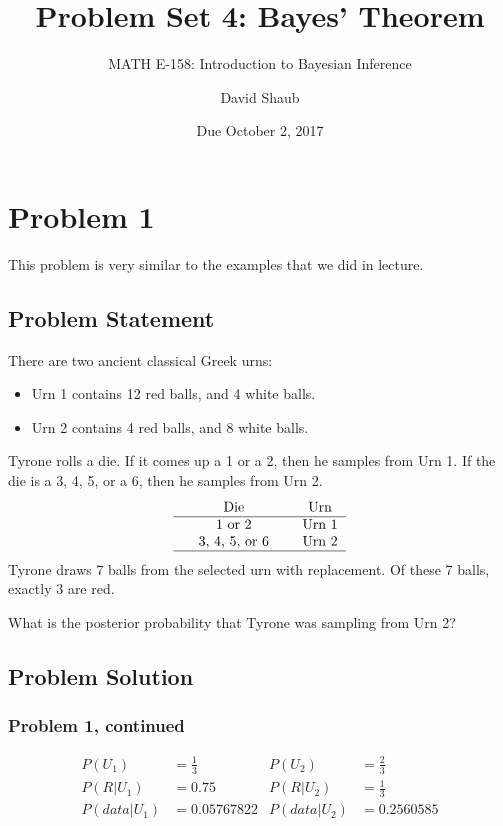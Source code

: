 \documentclass[12pt]{article}
\title{Problem Set 4: Bayes' Theorem}
\author{MATH E-158: Introduction to Bayesian Inference}
\author{David Shaub}
\date{Due October 2, 2017}
\theoremstyle{definition}
\begin{document}
	
	\maketitle





\section*{Problem 1}

This problem is very similar to the examples that we did in lecture.

\subsection*{Problem Statement}

There are two ancient classical Greek urns:
\begin{itemize}
	\item Urn 1 contains 12 red balls, and 4 white balls.
	\item Urn 2 contains 4 red balls, and 8 white balls.
\end{itemize}
Tyrone rolls a die. If it comes up a 1 or a 2, then he samples from Urn 1. If the die is a 3, 4, 5, or a 6, then he samples from Urn 2.
$$
\begin{tabular}{ccccc}
& Die & & Urn \\
\hline
& 1 or 2 & & Urn 1\\
& 3, 4, 5, or 6 & & Urn 2\\
\hline
\end{tabular}
$$
Tyrone draws 7 balls from the selected urn with replacement. Of these 7 balls, exactly 3 are red.

\bigskip
\noindent
What is the posterior probability that Tyrone was sampling from Urn 2?


\subsection*{Problem Solution}


\newpage
\subsubsection*{Problem 1, continued}
\begin{align*}
P(U_1) &= \frac{1}{3}  &P(U_2) &= \frac{2}{3}\\
P(R|U_1) &= 0.75 &P(R|U_2) &= \frac{1}{3}\\
P(data|U_1) &= 0.05767822 &P(data|U_2) &= 0.2560585\\
\end{align*}
\end{document}
